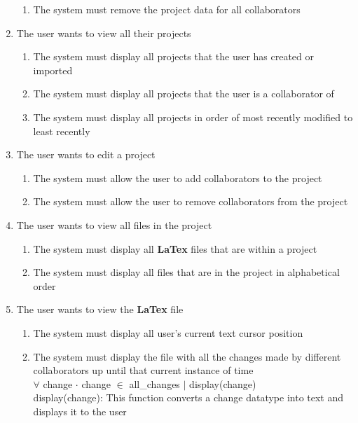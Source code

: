 \documentclass[12pt, titlepage]{article}
\begin{document}
\begin{enumerate}[{BE}1.]
\begin{enumerate}[resume*]
			\item The system must remove the project data for all collaborators
		\end{enumerate}
		\item The user wants to view all their projects
		\begin{enumerate}[resume*]
			\item The system must display all projects that the user has created or imported
			\item The system must display all projects that the user is a collaborator of
			\item The system must display all projects in order of most recently modified to least recently
		\end{enumerate}
		\item The user wants to edit a project
		\begin{enumerate}[resume*]
			\item The system must allow the user to add collaborators to the project
			\item The system must allow the user to remove collaborators from the project
		\end{enumerate}
		\item The user wants to view all files in the project
		\begin{enumerate}[resume*]
			\item The system must display all \textbf{LaTex} files that are within a project
			\item The system must display all files that are in the project in alphabetical order
		\end{enumerate}
		\item The user wants to view the \textbf{LaTex} file
		\begin{enumerate}[resume*]
			\item The system must display all user's current text cursor position
			\item The system must display the file with all the changes made by different collaborators up until that current instance of time\\
			
			$\forall$ change $\cdot$ change $\in$ all\_changes $\vert$ display(change)\\
			
			display(change): This function converts a change datatype into text and displays it to the user\\
			

\end{enumerate}
\end{enumerate}
\end{document}

